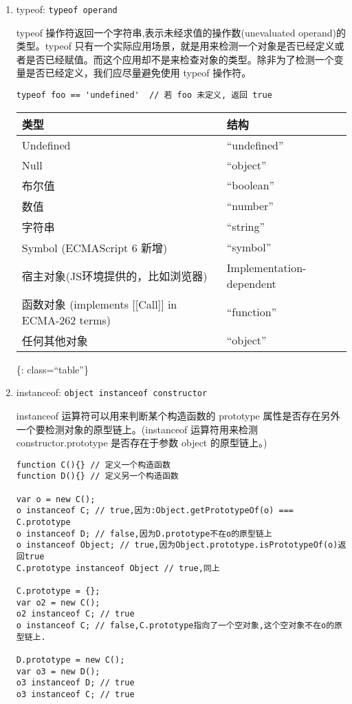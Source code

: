 \begin{enumerate}
\def\labelenumi{\arabic{enumi}.}
\item
  typeof: \lstinline!typeof operand!

  typeof 操作符返回一个字符串,表示未经求值的操作数(unevaluated
  operand)的类型。typeof
  只有一个实际应用场景，就是用来检测一个对象是否已经定义或者是否已经赋值。而这个应用却不是来检查对象的类型。除非为了检测一个变量是否已经定义，我们应尽量避免使用
  typeof 操作符。

\begin{lstlisting}
typeof foo == 'undefined'  // 若 foo 未定义, 返回 true
\end{lstlisting}

  \begin{longtable}[]{@{}ll@{}}
  \toprule
  类型 & 结构\tabularnewline
  \midrule
  \endhead
  Undefined & ``undefined''\tabularnewline
  Null & ``object''\tabularnewline
  布尔值 & ``boolean''\tabularnewline
  数值 & ``number''\tabularnewline
  字符串 & ``string''\tabularnewline
  Symbol (ECMAScript 6 新增) & ``symbol''\tabularnewline
  宿主对象(JS环境提供的，比如浏览器) &
  Implementation-dependent\tabularnewline
  函数对象 (implements {[}{[}Call{]}{]} in ECMA-262 terms) &
  ``function''\tabularnewline
  任何其他对象 & ``object''\tabularnewline
  \bottomrule
  \end{longtable}

  \{: class=``table''\}
\item
  instanceof: \lstinline!object instanceof constructor!

  instanceof 运算符可以用来判断某个构造函数的 prototype
  属性是否存在另外一个要检测对象的原型链上。(instanceof 运算符用来检测
  constructor.prototype 是否存在于参数 object 的原型链上。)

\begin{lstlisting}
function C(){} // 定义一个构造函数
function D(){} // 定义另一个构造函数

var o = new C();
o instanceof C; // true,因为:Object.getPrototypeOf(o) === C.prototype
o instanceof D; // false,因为D.prototype不在o的原型链上
o instanceof Object; // true,因为Object.prototype.isPrototypeOf(o)返回true
C.prototype instanceof Object // true,同上

C.prototype = {};
var o2 = new C();
o2 instanceof C; // true
o instanceof C; // false,C.prototype指向了一个空对象,这个空对象不在o的原型链上.

D.prototype = new C();
var o3 = new D();
o3 instanceof D; // true
o3 instanceof C; // true
\end{lstlisting}
\end{enumerate}

